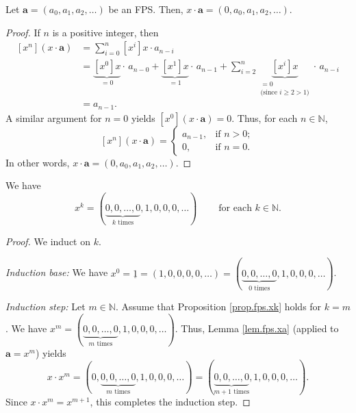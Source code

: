 \begin{lemma}
\label{lem.fps.xa}
\leantarget
\leanok
Let $\mathbf{a}=\left(a_{0},a_{1},a_{2},\ldots\right)$
be an FPS. Then, $x\cdot\mathbf{a}=\left(0,a_{0},a_{1},a_{2},\ldots\right)$.
\end{lemma}

\begin{proof}
\leanok
If $n$ is a positive integer, then
\begin{align*}
\left[x^{n}\right]\left(x\cdot\mathbf{a}\right) & =\sum_{i=0}%
^{n}\left[x^{i}\right]x\cdot a_{n-i}\\
& =\underbrace{\left[x^{0}\right]x}_{=0}\cdot\,a_{n-0}+\underbrace{\left[x^{1}\right]x}%
_{=1}\cdot\,a_{n-1}+\sum_{i=2}^{n}\underbrace{\left[x^{i}\right]
x}_{\substack{=0\\\text{(since }i\geq2>1\text{)}}}\cdot\,a_{n-i}\\
& =a_{n-1}.
\end{align*}
A similar argument for $n=0$ yields $\left[x^{0}\right]\left(x\cdot\mathbf{a}\right)=0$.
Thus, for each $n\in\mathbb{N}$,
\[
\left[x^{n}\right]\left(x\cdot\mathbf{a}\right) =
\begin{cases}
a_{n-1}, & \text{if }n>0;\\
0, & \text{if }n=0.
\end{cases}
\]
In other words, $x\cdot\mathbf{a}=\left(0,a_{0},a_{1},a_{2},\ldots\right)$.
\end{proof}

\begin{proposition}
\label{prop.fps.xk}
\leantarget
\leanok
We have
\[
x^{k}=\left(\underbrace{0,0,\ldots,0}_{k\text{ times}},1,0,0,0,\ldots
\right) \ \ \ \ \ \ \ \ \ \ \text{for each }k\in\mathbb{N}.
\]
\end{proposition}

\begin{proof}
We induct on $k$.

\textit{Induction base:} We have $x^{0}=\underline{1}=\left(1,0,0,0,0,\ldots
\right) = \left(\underbrace{0,0,\ldots,0}_{0\text{ times}},1,0,0,0,\ldots
\right)$.

\textit{Induction step:} Let $m\in\mathbb{N}$. Assume that Proposition
\ref{prop.fps.xk} holds for $k=m$. We have $x^{m}=\left(\underbrace{0,0,\ldots,0}_{m\text{ times}%
},1,0,0,0,\ldots\right)$. Thus, Lemma \ref{lem.fps.xa} (applied to $\mathbf{a}=x^{m}$) yields
\[
x\cdot x^{m}=\left(0,\underbrace{0,0,\ldots,0}_{m\text{ times}%
},1,0,0,0,\ldots\right) = \left(\underbrace{0,0,\ldots,0}_{m+1\text{ times}%
},1,0,0,0,\ldots\right).
\]
Since $x\cdot x^{m}=x^{m+1}$, this completes the induction step.
\end{proof}

